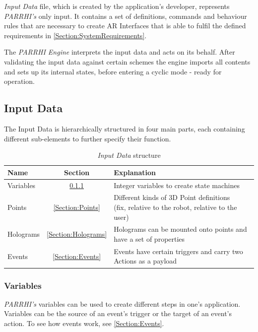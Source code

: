 \textit{Input Data} file, which is created by the application's developer, represents \textit{PARRHI's} only input. It contains a set of definitions, commands and behaviour rules that are necessary to create AR Interfaces that is able to fulfil the defined requirements in \ref{Section:SystemRequirements}.

The \textit{PARRHI Engine} interprets the input data and acts on its behalf. After validating the input data against certain schemes the engine imports all contents and sets up its internal states, before entering a cyclic mode - ready for operation.

\subsection{Input Data}

The Input Data is hierarchically structured in four main parts, each containing different sub-elements to further specify their function. 

\begin{table}
	\caption{\textit{Input Data} structure}
	\label{Tab:InputDataStructure}
	\centering
	\begin{tabular}{lcl}
		\toprule
		Name & Section		& Explanation	\\		
		\midrule
		Variables & \ref{Section:Variables}		& Integer variables to create state machines \\
		Points& \ref{Section:Points}		& \parbox[t]{10cm}{Different kinds of 3D Point definitions\\(fix, relative to the robot, relative to the user)} 	 \\
		Holograms& \ref{Section:Holograms} & Holograms can be mounted onto points and have a set of properties\\
		Events& \ref{Section:Events} & Events have certain triggers and carry two Actions as a payload \\
		\bottomrule
	\end{tabular}
\end{table}

\subsubsection{Variables}\label{Section:Variables}
\textit{PARRHI's} variables can be used to create different steps in one's application. Variables can be the source of an event's trigger or the target of an event's action. To see how events work, see \ref{Section:Events}.

